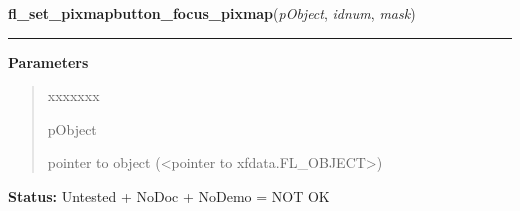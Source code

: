 \hspace{.8\funcindent}\begin{boxedminipage}{\funcwidth}

    \raggedright \textbf{fl\_set\_pixmapbutton\_focus\_pixmap}(\textit{pObject}, \textit{idnum}, \textit{mask})

    \vspace{-1.5ex}

    \rule{\textwidth}{0.5\fboxrule}
\setlength{\parskip}{2ex}
\setlength{\parskip}{1ex}
      \textbf{Parameters}
      \vspace{-1ex}

      \begin{quote}
        \begin{Ventry}{xxxxxxx}

          \item[pObject]

          pointer to object ({\textless}pointer to 
          xfdata.FL\_OBJECT{\textgreater})

        \end{Ventry}

      \end{quote}

\textbf{Status:} Untested + NoDoc + NoDemo = NOT OK



    \end{boxedminipage}

    \label{xformslib:library:fl_get_button}

    \vspace{0.5ex}

